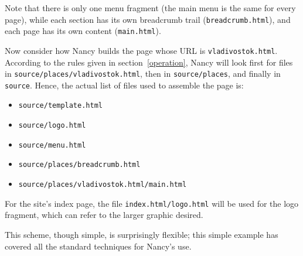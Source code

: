 \documentclass[a4paper,english]{scrartcl}
\begin{document}
Note that there is only one menu fragment (the main menu is the same for every page), while each section has its own breadcrumb trail (\verb|breadcrumb.html|), and each page has its own content (\verb|main.html|).

Now consider how Nancy builds the page whose URL is \verb|vladivostok.html|. According to the rules given in section~\ref{operation}, Nancy will look first for files in \verb|source/places/vladivostok.html|, then in \verb|source/places|, and finally in \verb|source|. Hence, the actual list of files used to assemble the page is:

\begin{itemize}
\item \verb|source/template.html|
\item \verb|source/logo.html|
\item \verb|source/menu.html|
\item \verb|source/places/breadcrumb.html|
\item \verb|source/places/vladivostok.html/main.html|
\end{itemize}

For the site’s index page, the file \verb|index.html/logo.html| will be used for the logo fragment, which can refer to the larger graphic desired.


This scheme, though simple, is surprisingly flexible; this simple example has covered all the standard techniques for Nancy’s use.
\end{document}
